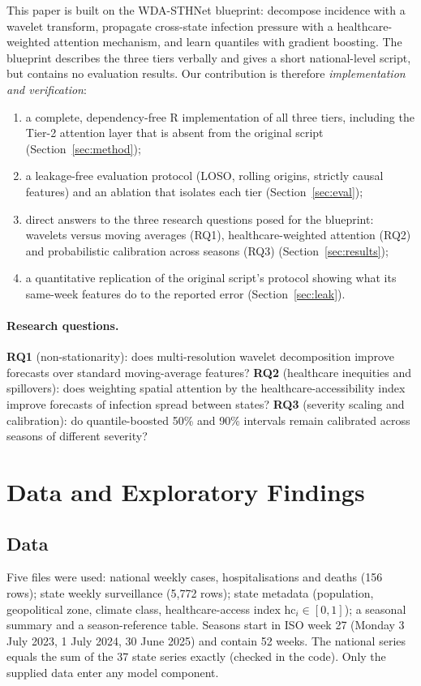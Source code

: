 \documentclass[11pt,a4paper]{article}
\newcommand{\hc}{\mathrm{hc}}
\begin{document}
This paper is built on the WDA-STHNet blueprint: decompose incidence with a wavelet transform, propagate cross-state infection pressure with a healthcare-weighted attention mechanism, and learn quantiles with gradient boosting. The blueprint describes the three tiers verbally and gives a short national-level script, but contains no evaluation results. Our contribution is therefore \emph{implementation and verification}:
\begin{enumerate}
\item a complete, dependency-free R implementation of all three tiers, including the Tier-2 attention layer that is absent from the original script (Section~\ref{sec:method});
\item a leakage-free evaluation protocol (LOSO, rolling origins, strictly causal features) and an ablation that isolates each tier (Section~\ref{sec:eval});
\item direct answers to the three research questions posed for the blueprint: wavelets versus moving averages (RQ1), healthcare-weighted attention (RQ2) and probabilistic calibration across seasons (RQ3) (Section~\ref{sec:results});
\item a quantitative replication of the original script's protocol showing what its same-week features do to the reported error (Section~\ref{sec:leak}).
\end{enumerate}

\paragraph{Research questions.}
\textbf{RQ1} (non-stationarity): does multi-resolution wavelet decomposition improve forecasts over standard moving-average features? \textbf{RQ2} (healthcare inequities and spillovers): does weighting spatial attention by the healthcare-accessibility index improve forecasts of infection spread between states? \textbf{RQ3} (severity scaling and calibration): do quantile-boosted 50\% and 90\% intervals remain calibrated across seasons of different severity?

\section{Data and Exploratory Findings}
\subsection{Data}
Five files were used: national weekly cases, hospitalisations and deaths (156 rows); state weekly surveillance (5,772 rows); state metadata (population, geopolitical zone, climate class, healthcare-access index $\hc_i\in[0,1]$); a seasonal summary and a season-reference table. Seasons start in ISO week 27 (Monday 3 July 2023, 1 July 2024, 30 June 2025) and contain 52 weeks. The national series equals the sum of the 37 state series exactly (checked in the code). Only the supplied data enter any model component.
\end{document}
